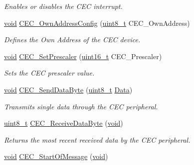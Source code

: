 \begin{DoxyCompactItemize}
\begin{DoxyCompactList}\small\item\em Enables or disables the C\-E\-C interrupt. \end{DoxyCompactList}\item 
\hyperlink{group___n_a_m_e_ga18028b8badbf1ea7e704ccac3c488e82}{void} \hyperlink{group___c_e_c___private___functions_gacad422ef1f50246b2021b41835b8a95c}{C\-E\-C\-\_\-\-Own\-Address\-Config} (\hyperlink{stdint_8h_aba7bc1797add20fe3efdf37ced1182c5}{uint8\-\_\-t} C\-E\-C\-\_\-\-Own\-Address)
\begin{DoxyCompactList}\small\item\em Defines the Own Address of the C\-E\-C device. \end{DoxyCompactList}\item 
\hyperlink{group___n_a_m_e_ga18028b8badbf1ea7e704ccac3c488e82}{void} \hyperlink{group___c_e_c___private___functions_gad2fc626e28a82008a29f062975a9af11}{C\-E\-C\-\_\-\-Set\-Prescaler} (\hyperlink{stdint_8h_a273cf69d639a59973b6019625df33e30}{uint16\-\_\-t} C\-E\-C\-\_\-\-Prescaler)
\begin{DoxyCompactList}\small\item\em Sets the C\-E\-C prescaler value. \end{DoxyCompactList}\item 
\hyperlink{group___n_a_m_e_ga18028b8badbf1ea7e704ccac3c488e82}{void} \hyperlink{group___c_e_c___private___functions_ga6897ab26d8f909f9160e9fac54b97441}{C\-E\-C\-\_\-\-Send\-Data\-Byte} (\hyperlink{stdint_8h_aba7bc1797add20fe3efdf37ced1182c5}{uint8\-\_\-t} \hyperlink{group___copter_control_b_l_ga6f3335509cc4943e20df66f72483910c}{Data})
\begin{DoxyCompactList}\small\item\em Transmits single data through the C\-E\-C peripheral. \end{DoxyCompactList}\item 
\hyperlink{stdint_8h_aba7bc1797add20fe3efdf37ced1182c5}{uint8\-\_\-t} \hyperlink{group___c_e_c___private___functions_ga165837bff6292e7674eff6f8b230da97}{C\-E\-C\-\_\-\-Receive\-Data\-Byte} (\hyperlink{group___n_a_m_e_ga18028b8badbf1ea7e704ccac3c488e82}{void})
\begin{DoxyCompactList}\small\item\em Returns the most recent received data by the C\-E\-C peripheral. \end{DoxyCompactList}\item 
\hyperlink{group___n_a_m_e_ga18028b8badbf1ea7e704ccac3c488e82}{void} \hyperlink{group___c_e_c___private___functions_ga71e700461ffe7820d9e1c75da65fd0fb}{C\-E\-C\-\_\-\-Start\-Of\-Message} (\hyperlink{group___n_a_m_e_ga18028b8badbf1ea7e704ccac3c488e82}{void})

\end{DoxyCompactItemize}
